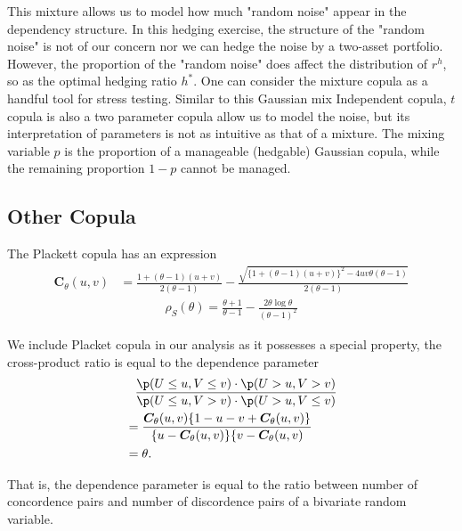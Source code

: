 This mixture allows us to model how much "random noise" appear in the dependency structure.
In this hedging exercise, the structure of the "random noise" is not of our concern nor we can
hedge the noise by a two-asset portfolio.
However, the proportion of the "random noise" does affect the distribution of $r^h$,
so as the optimal hedging ratio $h^\ast$.
One can consider the mixture copula as a handful tool for stress testing.
Similar to this Gaussian mix Independent copula,
$t$ copula is also a two parameter copula allow us to model the noise,
but its interpretation of parameters is not as intuitive as that of a mixture.
The mixing variable $p$ is the proportion of a manageable (hedgable) Gaussian copula,
while the remaining proportion $1-p$ cannot be managed.

\subsection{Other Copula}\label{subsec:other-copula}
The Plackett copula has an expression
\begin{align}
    \bm{C}_{\theta}(u,v) &= \frac{1+(\theta-1)(u+v)}{2(\theta-1)}
                         - \frac{\sqrt{\{
    1+(\theta-1)(u+v)\}^2 - 4uv\theta(\theta-1)}}{2(\theta-1)}
    \end{align}
\begin{align}
    \rho_S(\theta) = \frac{\theta+1}{\theta-1} - \frac{2\theta \log \theta}{(\theta-1)^2}
    \end{align}\medskip

We include Placket copula in our analysis as it possesses a special property,
the cross-product ratio is equal to the dependence parameter
\begin{align}
    &\phantom{=} \frac{\p(U \leq u, V \leq v) \cdot \p(U > u, V > v)}
    {\p(U \leq u, V > v) \cdot \p(U > u, V \leq v)}\nonumber\\
    &= \frac{\bm{C}_\theta(u,v)\{1-u-v+\bm{C}_\theta(u,v)\}}{\{u-\bm{C}_\theta(u,v)\}\{v-\bm{C}_\theta(u,v)}\nonumber\\
    &= \theta.
    \end{align}\medskip

That is, the dependence parameter is equal to the ratio between number of concordence pairs and number of discordence pairs of a bivariate random variable.

